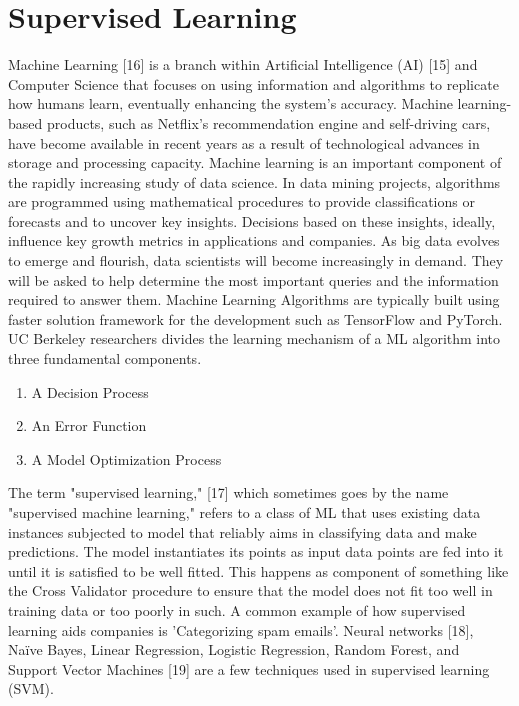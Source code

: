 \documentclass[conference]{IEEEtran}
\begin{document}
\section{Supervised Learning}
Machine Learning [16] is a branch within Artificial Intelligence (AI) [15] and Computer Science that focuses on using information and algorithms to replicate how humans learn, eventually enhancing the system's accuracy. Machine learning-based products, such as Netflix's recommendation engine and self-driving cars, have become available in recent years as a result of technological advances in storage and processing capacity. Machine learning is an important component of the rapidly increasing study of data science. In data mining projects, algorithms are programmed using mathematical procedures to provide classifications or forecasts and to uncover key insights. Decisions based on these insights, ideally, influence key growth metrics in applications and companies. As big data evolves to emerge and flourish, data scientists will become increasingly in demand. They will be asked to help determine the most important queries and the information required to answer them. Machine Learning Algorithms are typically built using faster solution framework for the development such as TensorFlow and PyTorch. \\ 

UC Berkeley researchers divides the learning mechanism of a ML algorithm into three fundamental components.
\begin{enumerate}
\item A Decision Process
\item An Error Function
\item A Model Optimization Process
\end{enumerate}
The term "supervised learning," [17] which sometimes goes by the name "supervised machine learning," refers to a class of ML that uses existing data instances subjected to model that reliably aims in classifying data and make predictions. The model instantiates its points as input data points are fed into it until it is satisfied to be well fitted. This happens as component of something like the Cross Validator procedure to ensure that the model does not fit too well in training data or too poorly in such. A common example of how supervised learning aids companies is 'Categorizing spam emails'. Neural networks [18], Naïve Bayes, Linear Regression, Logistic Regression, Random Forest, and Support Vector Machines [19] are a few techniques used in supervised learning (SVM). \\
\end{document}
